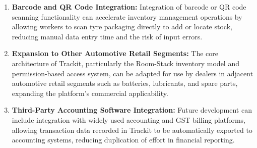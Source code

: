 \documentclass[12pt, oneside]{article}
\begin{document}
\begin{enumerate}
    \item \textbf{Barcode and QR Code Integration:} Integration of barcode or QR code scanning
    functionality can accelerate inventory management operations by allowing workers to scan
    tyre packaging directly to add or locate stock, reducing manual data entry time and the
    risk of input errors.

    \item \textbf{Expansion to Other Automotive Retail Segments:} The core architecture of
    Trackit, particularly the Room-Stack inventory model and permission-based access system,
    can be adapted for use by dealers in adjacent automotive retail segments such as batteries,
    lubricants, and spare parts, expanding the platform's commercial applicability.

    \item \textbf{Third-Party Accounting Software Integration:} Future development can include
    integration with widely used accounting and GST billing platforms, allowing transaction
    data recorded in Trackit to be automatically exported to accounting systems, reducing
    duplication of effort in financial reporting.

\end{enumerate}
\end{document}
